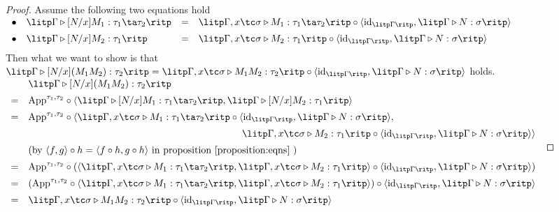 \begin{proof}
Assume the following two equations hold\\[5pt]
$
\begin{array}{rlcl}
\bullet & \litp \Gamma \triangleright [N/x]M_1: \tau_1 \ta \tau_2 \ritp & = & \litp \Gamma , x \tc \sigma \triangleright M_1: \tau_1 \ta \tau_2 \ritp \circ \langle \text{id}_{\litp \Gamma \ritp} , \litp \Gamma \triangleright N: \sigma \ritp \rangle \\[5pt]
\bullet & \litp \Gamma \triangleright [N/x]M_2: \tau_1 \ritp & = & \litp \Gamma , x \tc \sigma \triangleright M_2: \tau_1 \ritp \circ \langle \text{id}_{\litp \Gamma \ritp} , \litp \Gamma \triangleright N: \sigma \ritp \rangle \\[5pt]
\end{array}
$\\[5pt]
Then what we want to show is that $ \litp \Gamma \triangleright [N/x](M_1 M_2): \tau_2 \ritp = \litp \Gamma , x \tc \sigma \triangleright M_1 M_2: \tau_2 \ritp \circ \langle \text{id}_{\litp \Gamma \ritp} , \litp \Gamma \triangleright N: \sigma \ritp \rangle $ holds.\\[5pt]
$
\begin{array}{rl}
   & \litp \Gamma \triangleright [N/x](M_1 M_2): \tau_2 \ritp \\[5pt]
 = & \text{App}^{\tau_1,\tau_2} \circ \langle \litp \Gamma \triangleright [N/x]M_1: \tau_1 \ta \tau_2 \ritp , \litp \Gamma \triangleright [N/x]M_2: \tau_1 \ritp \rangle \\[5pt]
 = & \text{App}^{\tau_1,\tau_2} \circ \langle \litp \Gamma , x \tc \sigma \triangleright M_1: \tau_1 \ta \tau_2 \ritp \circ \langle \text{id}_{\litp \Gamma \ritp} , \litp \Gamma \triangleright N: \sigma \ritp \rangle , \\[5pt]
 \multicolumn{2}{r}{\litp \Gamma , x \tc \sigma \triangleright M_2: \tau_1 \ritp \circ \langle \text{id}_{\litp \Gamma \ritp} , \litp \Gamma \triangleright N: \sigma \ritp \rangle \rangle} \\[5pt]
   & (\text{by } \langle f,g \rangle \circ h = \langle f \circ h , g \circ h \rangle \text{ in proposition \ref{proposition:eqns} } ) \\[5pt]
 = & \text{App}^{\tau_1,\tau_2} \circ ( \langle \litp \Gamma , x \tc \sigma \triangleright M_1: \tau_1 \ta \tau_2 \ritp , \litp \Gamma , x \tc \sigma \triangleright M_2: \tau_1 \ritp \rangle \circ \langle \text{id}_{\litp \Gamma \ritp} , \litp \Gamma \triangleright N: \sigma \ritp \rangle ) \\[5pt]
 = & ( \text{App}^{\tau_1,\tau_2} \circ \langle \litp \Gamma , x \tc \sigma \triangleright M_1: \tau_1 \ta \tau_2 \ritp , \litp \Gamma , x \tc \sigma \triangleright M_2: \tau_1 \ritp \rangle ) \circ \langle \text{id}_{\litp \Gamma \ritp} , \litp \Gamma \triangleright N: \sigma \ritp \rangle \\[5pt]
 = & \litp \Gamma , x \tc \sigma \triangleright M_1 M_2: \tau_2 \ritp \circ \langle \text{id}_{\litp \Gamma \ritp} , \litp \Gamma \triangleright N: \sigma \ritp \rangle \\[10pt]
\end{array}
$


\end{proof}
